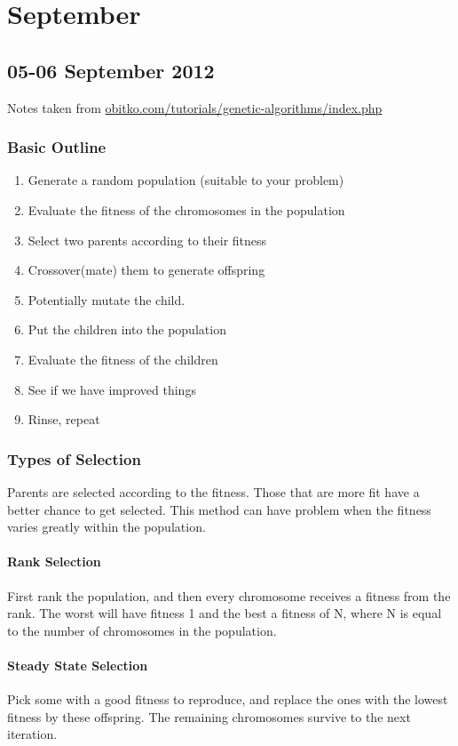 \chapter{September}
\section{05-06 September 2012}
Notes taken from \url{obitko.com/tutorials/genetic-algorithms/index.php}
\subsection{Basic Outline}
\begin{enumerate}
\item Generate a random population (suitable to your problem)
\item Evaluate the fitness of the chromosomes in the population
\item Select two parents according to their fitness
\item Crossover(mate) them to generate offspring
\item Potentially mutate the child. 
\item Put the children into the population
\item Evaluate the fitness of the children
\item See if we have improved things
\item Rinse, repeat
\end{enumerate}

\subsection{Types of Selection}
Parents are selected according to the fitness. Those that are more fit have a 
better chance to get selected. This method can have problem when the fitness 
varies greatly within the population.

\subsubsection{Rank Selection}
First rank the population, and then every chromosome receives a fitness from 
the rank. The worst will have fitness 1 and the best a fitness of N, where
N is equal to the number of chromosomes in the population.

\subsubsection{Steady State Selection}
Pick some with a good fitness to reproduce, and replace the ones with the lowest 
fitness by these offspring. The remaining chromosomes survive to the next iteration.

